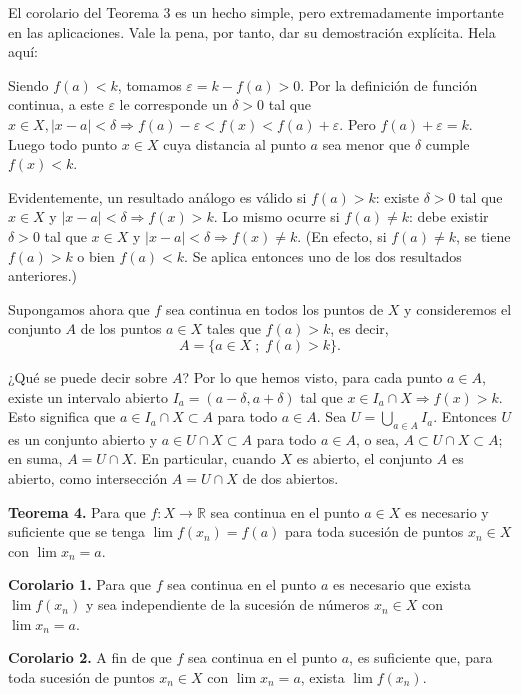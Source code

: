 \documentclass[12pt,oneside]{book}
\begin{document}
El corolario del Teorema 3 es un hecho simple, pero extremadamente importante en las aplicaciones. Vale la pena, por tanto, dar su demostración explícita. Hela aquí:

Siendo \(f(a) < k\), tomamos \(\varepsilon = k - f(a) > 0\). Por la definición de función continua, a este \(\varepsilon\) le corresponde un \(\delta > 0\) tal que \(x \in X, |x - a| < \delta \Rightarrow f(a) - \varepsilon < f(x) < f(a) + \varepsilon\). Pero \(f(a) + \varepsilon = k\). Luego todo punto \(x \in X\) cuya distancia al punto \(a\) sea menor que \(\delta\) cumple \(f(x) < k\).

Evidentemente, un resultado análogo es válido si \(f(a) > k\): existe \(\delta > 0\) tal que \(x \in X\) y \(|x - a| < \delta \Rightarrow f(x) > k\). Lo mismo ocurre si \(f(a) \neq k\): debe existir \(\delta > 0\) tal que \(x \in X\) y \(|x - a| < \delta \Rightarrow f(x) \neq k\). (En efecto, si \(f(a) \neq k\), se tiene \(f(a) > k\) o bien \(f(a) < k\). Se aplica entonces uno de los dos resultados anteriores.)

Supongamos ahora que \(f\) sea continua en todos los puntos de \(X\) y consideremos el conjunto \(A\) de los puntos \(a \in X\) tales que \(f(a) > k\), es decir,
\[
A = \{a \in X \; ; \; f(a) > k\}.
\]

¿Qué se puede decir sobre \(A\)? Por lo que hemos visto, para cada punto \(a \in A\), existe un intervalo abierto \(I_a = (a - \delta, a + \delta)\) tal que \(x \in I_a \cap X \Rightarrow f(x) > k\). Esto significa que \(a \in I_a \cap X \subset A\) para todo \(a \in A\). Sea \(U = \bigcup_{a \in A} I_a\). Entonces \(U\) es un conjunto abierto y \(a \in U \cap X \subset A\) para todo \(a \in A\), o sea, \(A \subset U \cap X \subset A\); en suma, \(A = U \cap X\). En particular, cuando \(X\) es abierto, el conjunto \(A\) es abierto, como intersección \(A = U \cap X\) de dos abiertos.

\textbf{Teorema 4.} Para que \(f: X \to \mathbb{R}\) sea continua en el punto \(a \in X\) es necesario y suficiente que se tenga \(\lim f(x_n) = f(a)\) para toda sucesión de puntos \(x_n \in X\) con \(\lim x_n = a\).

\textbf{Corolario 1.} Para que \(f\) sea continua en el punto \(a\) es necesario que exista \(\lim f(x_n)\) y sea independiente de la sucesión de números \(x_n \in X\) con \(\lim x_n = a\).

\textbf{Corolario 2.} A fin de que \(f\) sea continua en el punto \(a\), es suficiente que, para toda sucesión de puntos \(x_n \in X\) con \(\lim x_n = a\), exista \(\lim f(x_n)\).
\end{document}
